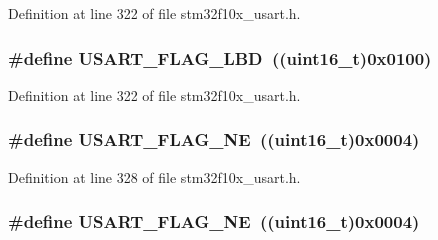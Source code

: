 Definition at line 322 of file stm32f10x\+\_\+usart.\+h.

\subsubsection[{\texorpdfstring{U\+S\+A\+R\+T\+\_\+\+F\+L\+A\+G\+\_\+\+L\+BD}{USART_FLAG_LBD}}]{\setlength{\rightskip}{0pt plus 5cm}\#define U\+S\+A\+R\+T\+\_\+\+F\+L\+A\+G\+\_\+\+L\+BD~(({\bf uint16\+\_\+t})0x0100)}\hypertarget{group___u_s_a_r_t___flags_ga27be6517de20ce14711f71dcd5a7b91f}{}\label{group___u_s_a_r_t___flags_ga27be6517de20ce14711f71dcd5a7b91f}


Definition at line 322 of file stm32f10x\+\_\+usart.\+h.

\subsubsection[{\texorpdfstring{U\+S\+A\+R\+T\+\_\+\+F\+L\+A\+G\+\_\+\+NE}{USART_FLAG_NE}}]{\setlength{\rightskip}{0pt plus 5cm}\#define U\+S\+A\+R\+T\+\_\+\+F\+L\+A\+G\+\_\+\+NE~(({\bf uint16\+\_\+t})0x0004)}\hypertarget{group___u_s_a_r_t___flags_ga81781d27ffc8b85dfaf7b7b791229547}{}\label{group___u_s_a_r_t___flags_ga81781d27ffc8b85dfaf7b7b791229547}


Definition at line 328 of file stm32f10x\+\_\+usart.\+h.

\subsubsection[{\texorpdfstring{U\+S\+A\+R\+T\+\_\+\+F\+L\+A\+G\+\_\+\+NE}{USART_FLAG_NE}}]{\setlength{\rightskip}{0pt plus 5cm}\#define U\+S\+A\+R\+T\+\_\+\+F\+L\+A\+G\+\_\+\+NE~(({\bf uint16\+\_\+t})0x0004)}\hypertarget{group___u_s_a_r_t___flags_ga81781d27ffc8b85dfaf7b7b791229547}{}\label{group___u_s_a_r_t___flags_ga81781d27ffc8b85dfaf7b7b791229547}


